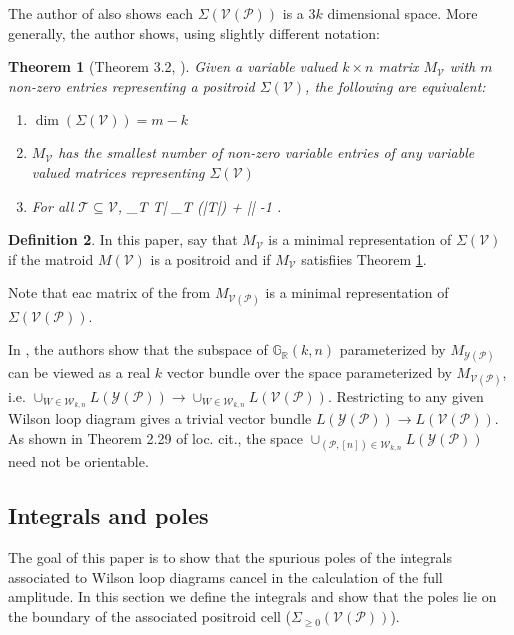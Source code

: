 \documentclass[11pt]{article}
\newcommand{\R}{\mathbb{R}}
\newcommand{\Grall}{\mathbb{G}_{\R}}
\def\bas #1\eas{\begin{align*} #1 \end{align*}}
\newcommand{\cP}{\mathcal{P}}
\newcommand{\cV}{\mathcal{V}}
\newcommand{\cY}{\mathcal{Y}}
\newcommand{\VP}{\cV(\cP)}
\newcommand{\YP}{\cY(\cP)}
\newcommand{\Sigmapos}{\Sigma_{\geq 0}}
\newcommand{\cW}{\mathcal{W}}
\newtheorem{thm}{Theorem}[section]
\theoremstyle{remark}
\theoremstyle{definition}
\newtheorem{dfn}[thm]{Definition}
\begin{document}
The author of \cite{basisshapeloci} also shows each $\Sigma(\VP)$ is a $3k$ dimensional space. More generally, the author shows, using slightly different notation:

\begin{thm}[Theorem 3.2, \cite{basisshapeloci}]\label{res:minimalrep}
Given a variable valued $k \times n$ matrix $M_\cV$ with $m$ non-zero entries representing a positroid  $\Sigma(\cV)$, the following are equivalent:
\begin{enumerate}
\item $\dim(\Sigma(\cV)) = m -k$ 
\item $M_\cV$ has the smallest number of non-zero variable entries of any variable valued matrices representing $\Sigma(\cV)$
\item For all $\mathcal{T} \subseteq \cV$, \bas |\bigcup_{T \in {}}T| \geq \max_{T \in  {}} (|T|) + || -1 \;. \eas
\end{enumerate}
\end{thm}

\begin{dfn}
In this paper, say that $M_{\cV}$ is a minimal representation of $\Sigma(\cV)$ if the matroid $M(\cV)$ is a positroid and if $M_{\cV}$ satisfiies Theorem \ref{res:minimalrep}.
\end{dfn}

Note that eac matrix of the from $M_{\VP}$ is a minimal representation of $\Sigma(\VP)$. 

In \cite[section 2.3]{non-orientable}, the authors show that  the subspace of $\Grall(k,n)$ parameterized by $M_{\YP}$ can be viewed as a real $k$ vector bundle over the space parameterized by $M_{\VP}$, i.e.  $\cup_{W \in \cW_{k,n}}L(\YP) \rightarrow \cup_{W \in \cW_{k,n}}L(\VP)$. Restricting to any given Wilson loop diagram gives a trivial vector bundle $L(\YP) \rightarrow L(\VP)$. As shown in Theorem 2.29 of loc. cit., the space $\cup_{(\cP, [n]) \in \cW_{k,n}}L(\YP)$ need not be orientable. 


\subsection{Integrals and poles \label{sec:integrals}}

The goal of this paper is to show that the spurious poles of the integrals associated to Wilson loop diagrams cancel in the calculation of the full amplitude. In this section we define the integrals and show that the poles lie on the boundary of the associated positroid cell ($\Sigmapos(\VP)$).
\end{document}
